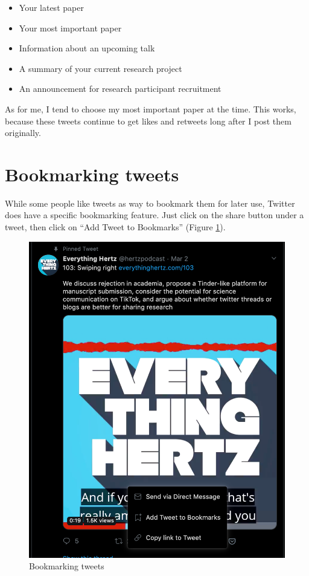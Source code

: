 \documentclass[]{book}
\providecommand{\tightlist}{%
  \setlength{\itemsep}{0pt}\setlength{\parskip}{0pt}}
\begin{document}
\begin{itemize}
\tightlist
\item
  Your latest paper
\item
  Your most important paper
\item
  Information about an upcoming talk
\item
  A summary of your current research project
\item
  An announcement for research participant recruitment
\end{itemize}

As for me, I tend to choose my most important paper at the time. This works, because these tweets continue to get likes and retweets long after I post them originally.

\hypertarget{bookmarking-tweets}{%
\section{Bookmarking tweets}\label{bookmarking-tweets}}

While some people like tweets as way to bookmark them for later use, Twitter does have a specific bookmarking feature. Just click on the share button under a tweet, then click on ``Add Tweet to Bookmarks'' (Figure \ref{fig:bookmark}).

\begin{figure}

{\centering \includegraphics[width=0.8\linewidth]{images/bookmark} 

}

\caption{Bookmarking tweets}\label{fig:bookmark}
\end{figure}
\end{document}
